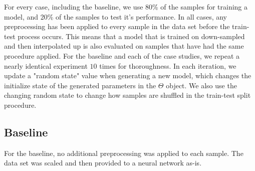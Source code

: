 \documentclass{IEEEtran}
\begin{document}
For every case, including the baseline, we use 80\% of the samples for training a model, and 20\% of the samples to test it's performance. In all cases, any preprocessing has been applied to every sample in the data set before the train-test process occurs. This means that a model that is trained on down-sampled and then interpolated up is also evaluated on samples that have had the same procedure applied.  For the baseline and each of the case studies, we repeat a nearly identical experiment $10$ times for thoroughness. In each iteration, we update a "random state" value when generating a new model, which changes the initialize state of the generated parameters in the $\Theta$ object. We also use the changing random state to change how samples are shuffled in the train-test split procedure.

\subsection{Baseline}
For the baseline, no additional preprocessing was applied to each sample. The data set was scaled and then provided to a neural network as-is. 
\end{document}
